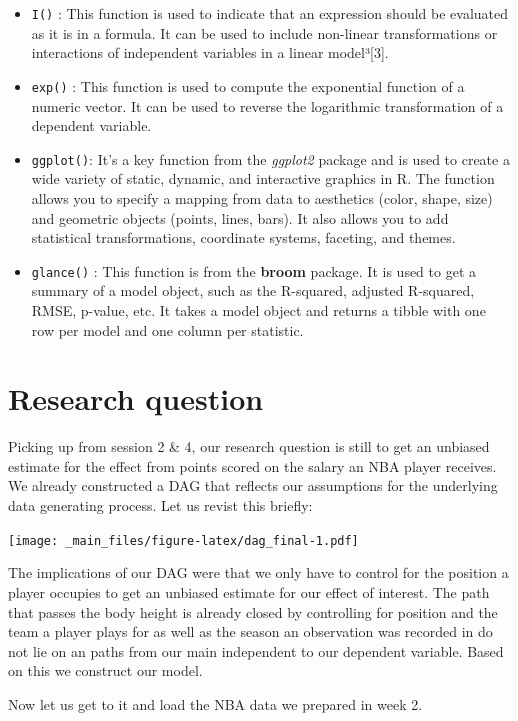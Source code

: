 \documentclass[
]{book}
\begin{document}
\begin{itemize}
\item
  \texttt{I()} : This function is used to indicate that an expression should be evaluated as it is in a formula. It can be used to include non-linear transformations or interactions of independent variables in a linear model³{[}3{]}.
\item
  \texttt{exp()} : This function is used to compute the exponential function of a numeric vector. It can be used to reverse the logarithmic transformation of a dependent variable.
\item
  \texttt{ggplot()}: It's a key function from the \emph{ggplot2} package and is used to create a wide variety of static, dynamic, and interactive graphics in R. The function allows you to specify a mapping from data to aesthetics (color, shape, size) and geometric objects (points, lines, bars). It also allows you to add statistical transformations, coordinate systems, faceting, and themes.
\item
  \texttt{glance()} : This function is from the \textbf{broom} package. It is used to get a summary of a model object, such as the R-squared, adjusted R-squared, RMSE, p-value, etc. It takes a model object and returns a tibble with one row per model and one column per statistic.
\end{itemize}

\hypertarget{research-question}{%
\section{Research question}\label{research-question}}

Picking up from session 2 \& 4, our research question is still to get an unbiased
estimate for the effect from points scored on the salary an NBA player receives.
We already constructed a DAG that reflects our assumptions for the underlying
data generating process. Let us revist this briefly:

\texttt{[image: \_main\_files/figure-latex/dag\_final-1.pdf]}

The implications of our DAG were that we only have to control for the position
a player occupies to get an unbiased estimate for our effect of interest.
The path that passes the body height is already closed by controlling for
position and the team a player plays for as well as the season an observation
was recorded in do not lie on an paths from our main independent to our
dependent variable.
Based on this we construct our model.

Now let us get to it and load the NBA data we prepared in week 2.
\end{document}
